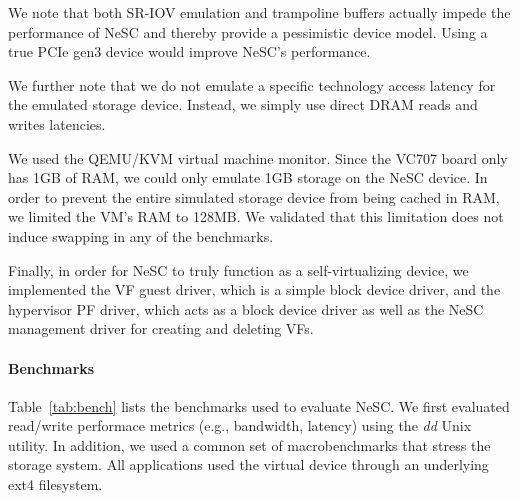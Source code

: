 We note that both SR-IOV emulation and trampoline buffers actually impede the performance of NeSC and thereby provide a pessimistic device model. Using a true PCIe gen3 device would improve NeSC's performance.

We further note that we do not emulate a specific technology access latency for the emulated storage device. Instead, we simply use direct DRAM reads and writes latencies.

We used the QEMU/KVM virtual machine monitor. Since the VC707 board only has 1GB of RAM, we could only emulate 1GB storage on the NeSC device. In order to prevent the entire simulated storage device from being cached in RAM, we limited the VM's RAM to 128MB. We validated that this limitation does not induce swapping in any of the benchmarks.

Finally, in order for NeSC to truly function as a self-virtualizing device, we implemented the VF guest driver, which is a simple block device driver, and the hypervisor PF driver, which acts as a block device driver as well as the NeSC management driver for creating and deleting VFs.  

\paragraph{Benchmarks}
Table~\ref{tab:bench} lists the benchmarks used to evaluate NeSC.
We first evaluated read/write performace metrics (e.g., bandwidth, latency) using the \emph{dd} Unix utility.
In addition, we used a common set of macrobenchmarks that stress the storage system.
All applications used the virtual device through an underlying ext4 filesystem.

